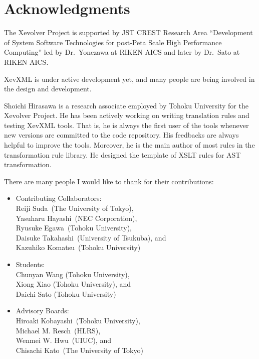 \chapter*{Acknowledgments}

The Xevolver Project is supported by JST CREST Research Area
``Development of System Software Technologies for post-Peta Scale High
Performance Computing'' led by Dr.~Yonezawa at RIKEN AICS and later by
Dr.~Sato at RIKEN AICS.

XevXML is under active development yet, and many people are being
involved in the design and development.

Shoichi Hirasawa is a research associate employed by Tohoku University
for the Xevolver Project.  He has been actively working on writing
translation rules and testing XevXML tools. That is, he is always the
first user of the tools whenever new versions are committed to the code
repository.  His feedbacks are always helpful to improve the
tools. Moreover, he is the main author of most rules in the
transformation rule library. He designed the template of XSLT rules for
AST transformation.

There are many people I would like to thank for their contributions:
\begin{itemize}
 \item Contributing Collaborators: \\
       Reiji Suda~(The University of Tokyo),\\
       Yasuharu Hayashi~(NEC Corporation),\\
       Ryusuke Egawa~(Tohoku University),\\
       Daisuke Takahashi~(University of Tsukuba), and \\
       Kazuhiko Komatsu~(Tohoku University)

 \item Students: \\
       Chunyan Wang (Tohoku University),\\
       Xiong Xiao (Tohoku University), and \\
       Daichi Sato (Tohoku University)

 \item Advisory Boards:\\
       Hiroaki Kobayashi~(Tohoku University),\\
       Michael M. Resch~(HLRS),\\
       Wenmei W. Hwu~(UIUC), and\\
       Chisachi Kato~(The University of Tokyo)
\end{itemize}

